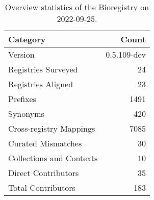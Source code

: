 \begin{table}
\centering
\caption{Overview statistics of the Bioregistry on 2022-09-25.}
\label{tab:bioregistry-summary}
\begin{tabular}{lr}
\toprule
                Category &       Count \\
\midrule
                 Version & 0.5.109-dev \\
     Registries Surveyed &          24 \\
      Registries Aligned &          23 \\
                Prefixes &        1491 \\
                Synonyms &         420 \\
 Cross-registry Mappings &        7085 \\
      Curated Mismatches &          30 \\
Collections and Contexts &          10 \\
     Direct Contributors &          35 \\
      Total Contributors &         183 \\
\bottomrule
\end{tabular}
\end{table}
